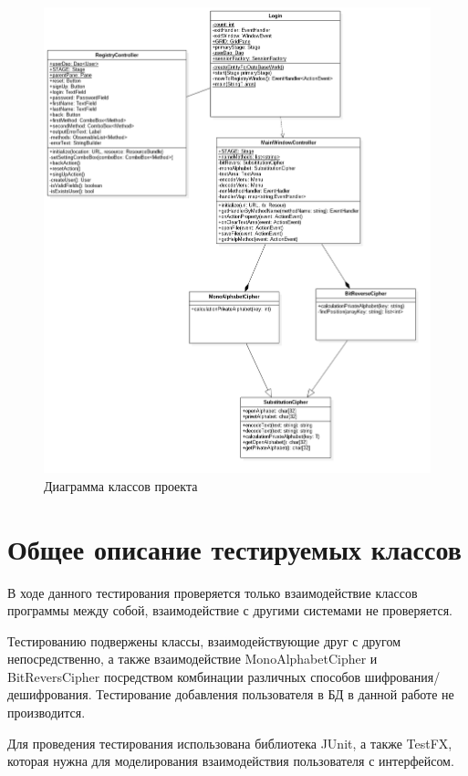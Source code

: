 \documentclass[a4paper,12pt]{article}
\begin{document}
\begin{center}
	\begin{figure}[h!]
		\centering
   		\includegraphics[scale=0.5]{img/class_diagram.png}
   		\caption{Диаграмма классов проекта}
   		\label{fig:class_diagram}
    \end{figure}
\end{center}

\newpage\section{Общее описание тестируемых классов}
В ходе данного тестирования проверяется только взаимодействие классов программы между собой, взаимодействие с другими системами не проверяется.

Тестированию подвержены классы, взаимодействующие друг с другом непосредственно, а также взаимодействие MonoAlphabetCipher и BitReversCipher посредством комбинации различных способов шифрования/дешифрования.
Тестирование добавления пользователя в БД в данной работе не производится.

Для проведения тестирования использована библиотека JUnit, а также TestFX, которая нужна для моделирования взаимодействия пользователя с интерфейсом.
\end{document}
